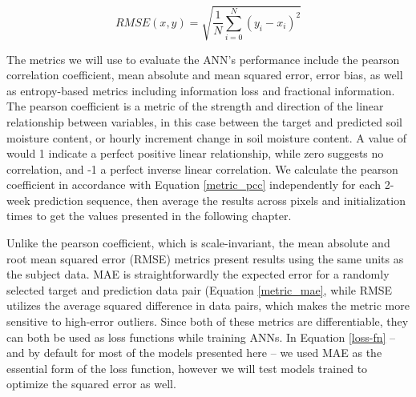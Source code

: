 \begin{equation}
    \label{metric_rmse}
    RMSE(x,y) = \sqrt{\frac{1}{N}\sum_{i=0}^{N}\left(y_i-x_i\right)^2}
\end{equation}

The metrics we will use to evaluate the ANN's performance include the pearson correlation coefficient, mean absolute and mean squared error, error bias, as well as entropy-based metrics including information loss and fractional information. The pearson coefficient is a metric of the strength and direction of the linear relationship between variables, in this case between the target and predicted soil moisture content, or hourly increment change in soil moisture content. A value of would 1 indicate a perfect positive linear relationship, while zero suggests no correlation, and -1 a perfect inverse linear correlation. We calculate the pearson coefficient in accordance with Equation \ref{metric_pcc} independently for each 2-week prediction sequence, then average the results across pixels and initialization times to get the values presented in the following chapter.

Unlike the pearson coefficient, which is scale-invariant, the mean absolute and root mean squared error (RMSE) metrics present results using the same units as the subject data. MAE is straightforwardly the expected error for a randomly selected target and prediction data pair (Equation \ref{metric_mae}, while RMSE utilizes the average squared difference in data pairs, which makes the metric more sensitive to high-error outliers. Since both of these metrics are differentiable, they can both be used as loss functions while training ANNs. In Equation \ref{loss-fn} -- and by default for most of the models presented here -- we used MAE as the essential form of the loss function, however we will test models trained to optimize the squared error as well.

